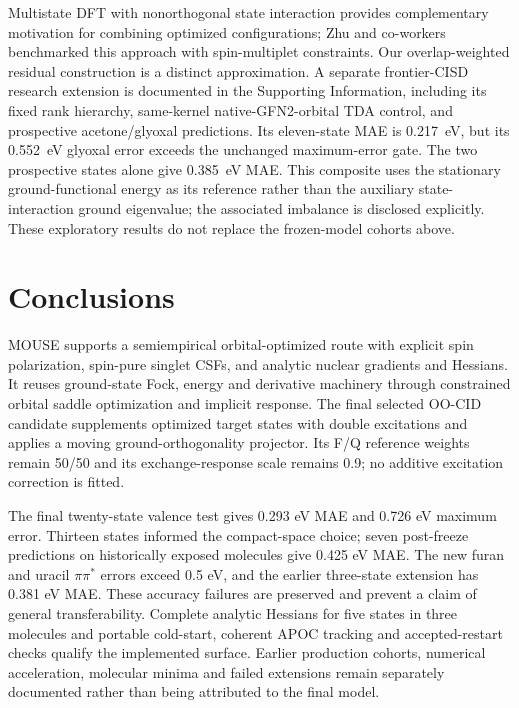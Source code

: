 \documentclass[11pt,a4paper]{article}
\begin{document}






Multistate DFT with nonorthogonal state interaction provides complementary motivation for combining optimized configurations; Zhu and co-workers benchmarked this approach with spin-multiplet constraints.\cite{zhu2023nosi} Our overlap-weighted residual construction is a distinct approximation. A separate frontier-CISD research extension is documented in the Supporting Information, including its fixed rank hierarchy, same-kernel native-GFN2-orbital TDA control, and prospective acetone/glyoxal predictions. Its eleven-state MAE is 0.217~eV, but its 0.552~eV glyoxal error exceeds the unchanged maximum-error gate. The two prospective states alone give 0.385~eV MAE. This composite uses the stationary ground-functional energy as its reference rather than the auxiliary state-interaction ground eigenvalue; the associated imbalance is disclosed explicitly. These exploratory results do not replace the frozen-model cohorts above.



\section{Conclusions}
MOUSE supports a semiempirical orbital-optimized route with explicit spin
polarization, spin-pure singlet CSFs, and analytic nuclear gradients and
Hessians. It reuses ground-state Fock, energy and derivative machinery through
constrained orbital saddle optimization and implicit response. The final
selected OO-CID candidate supplements optimized target states with double
excitations and applies a moving ground-orthogonality projector. Its F/Q
reference weights remain 50/50 and its exchange-response scale remains 0.9;
no additive excitation correction is fitted.

The final twenty-state valence test gives 0.293 eV MAE and 0.726 eV maximum
error. Thirteen states informed the compact-space choice; seven post-freeze
predictions on historically exposed molecules give 0.425 eV MAE. The new
furan and uracil $\pi\pi^*$ errors exceed 0.5 eV, and the earlier three-state
extension has 0.381 eV MAE. These accuracy failures are preserved and prevent
a claim of general transferability. Complete analytic Hessians for five states
in three molecules and portable cold-start, coherent APOC tracking and
accepted-restart checks qualify the implemented surface. Earlier production
cohorts, numerical acceleration, molecular minima and failed extensions
remain separately documented rather than being attributed to the final model.
\end{document}
